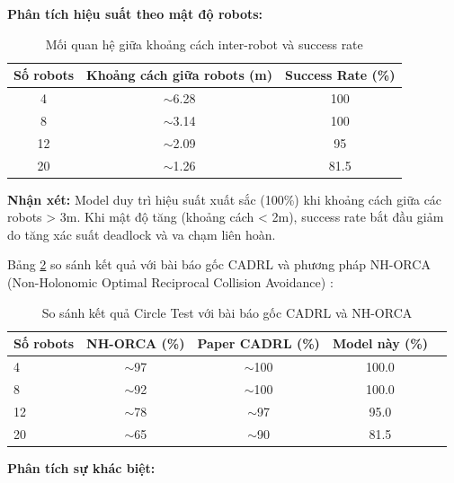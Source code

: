 \textbf{Phân tích hiệu suất theo mật độ robots:}

\begin{table}[H]
\centering
\caption{Mối quan hệ giữa khoảng cách inter-robot và success rate}
\label{tab:density_analysis}
\begin{tabular}{ccc}
\hline
\textbf{Số robots} & \textbf{Khoảng cách giữa robots (m)} & \textbf{Success Rate (\%)} \\
\hline
4 & $\sim$6.28 & 100 \\
8 & $\sim$3.14 & 100 \\
12 & $\sim$2.09 & 95 \\
20 & $\sim$1.26 & 81.5 \\
\hline
\end{tabular}
\end{table}

\textbf{Nhận xét:} Model duy trì hiệu suất xuất sắc (100\%) khi khoảng cách giữa các robots > 3m. Khi mật độ tăng (khoảng cách < 2m), success rate bắt đầu giảm do tăng xác suất deadlock và va chạm liên hoàn.

Bảng \ref{tab:paper_comparison} so sánh kết quả với bài báo gốc CADRL và phương pháp NH-ORCA (Non-Holonomic Optimal Reciprocal Collision Avoidance) \cite{long2018towards}:

\begin{table}[H]
\centering
\caption{So sánh kết quả Circle Test với bài báo gốc CADRL và NH-ORCA}
\label{tab:paper_comparison}
\begin{tabular}{lcccc}
\hline
\textbf{Số robots} & \textbf{NH-ORCA (\%)} & \textbf{Paper CADRL (\%)} & \textbf{Model này (\%)} \\
\hline
4 & $\sim$97 & $\sim$100 & 100.0 \\
8 & $\sim$92 & $\sim$100 & 100.0 \\
12 & $\sim$78 & $\sim$97 & 95.0 \\
20 & $\sim$65 & $\sim$90 & 81.5 \\
\hline
\end{tabular}
\end{table}

\textbf{Phân tích sự khác biệt:}

